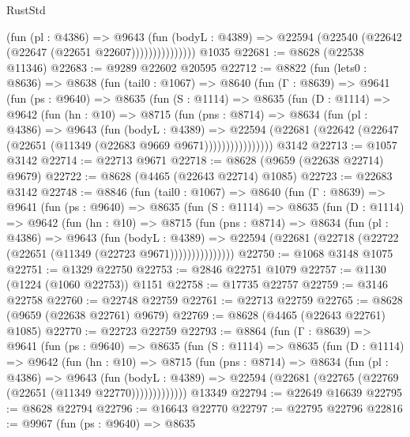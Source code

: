 \begin{lexlean}{RustStd}
\begin{coremodule}
                      (fun (pl : @4386) =>
                      @9643
                        (fun (bodyL : @4389) =>
                        @22594 (@22540 (@22642 (@22647 (@22651 @22607)))))))))))))))
    @1035
@22681 := @8628 (@22538 @11346)
@22683 := @9289 @22602 @20595
@22712 := @8822
    (fun (lets0 : @8636) =>
    @8638
      (fun (tail0 : @1067) =>
      @8640
        (fun (Γ : @8639) =>
        @9641
          (fun (ps : @9640) =>
          @8635
            (fun (S : @1114) =>
            @8635
              (fun (D : @1114) =>
              @9642
                (fun (hn : @10) =>
                @8715
                  (fun (pns : @8714) =>
                  @8634
                    (fun (pl : @4386) =>
                    @9643
                      (fun (bodyL : @4389) =>
                      @22594
                        (@22681 (@22642 (@22647 (@22651 (@11349 (@22683 @9669 @9671))))))))))))))))
    @3142
@22713 := @1057 @3142
@22714 := @22713 @9671
@22718 := @8628 (@9659 (@22638 @22714) @9679)
@22722 := @8628 (@4465 (@22643 @22714) @1085)
@22723 := @22683 @3142
@22748 := @8846
    (fun (tail0 : @1067) =>
    @8640
      (fun (Γ : @8639) =>
      @9641
        (fun (ps : @9640) =>
        @8635
          (fun (S : @1114) =>
          @8635
            (fun (D : @1114) =>
            @9642
              (fun (hn : @10) =>
              @8715
                (fun (pns : @8714) =>
                @8634
                  (fun (pl : @4386) =>
                  @9643
                    (fun (bodyL : @4389) =>
                    @22594 (@22681 (@22718 (@22722 (@22651 (@11349 (@22723 @9671)))))))))))))))
@22750 := @1068 @3148 @1075
@22751 := @1329 @22750
@22753 := @2846 @22751 @1079
@22757 := @1130 (@1224 (@1060 @22753)) @1151
@22758 := @17735 @22757
@22759 := @3146 @22758
@22760 := @22748 @22759
@22761 := @22713 @22759
@22765 := @8628 (@9659 (@22638 @22761) @9679)
@22769 := @8628 (@4465 (@22643 @22761) @1085)
@22770 := @22723 @22759
@22793 := @8864
    (fun (Γ : @8639) =>
    @9641
      (fun (ps : @9640) =>
      @8635
        (fun (S : @1114) =>
        @8635
          (fun (D : @1114) =>
          @9642
            (fun (hn : @10) =>
            @8715
              (fun (pns : @8714) =>
              @8634
                (fun (pl : @4386) =>
                @9643
                  (fun (bodyL : @4389) =>
                  @22594 (@22681 (@22765 (@22769 (@22651 (@11349 @22770)))))))))))))
    @13349
@22794 := @22649 @16639
@22795 := @8628 @22794
@22796 := @16643 @22770
@22797 := @22795 @22796
@22816 := @9967
    (fun (ps : @9640) =>
    @8635

\end{coremodule}
\end{lexlean}
